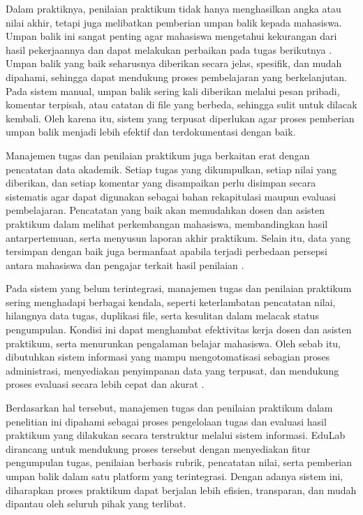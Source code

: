 \documentclass[12pt,a4paper,twoside]{report}
\begin{document}
Dalam praktiknya, penilaian praktikum tidak hanya menghasilkan angka atau nilai akhir, tetapi juga melibatkan pemberian umpan balik kepada mahasiswa. Umpan balik ini sangat penting agar mahasiswa mengetahui kekurangan dari hasil pekerjaannya dan dapat melakukan perbaikan pada tugas berikutnya \cite{nicol2006}. Umpan balik yang baik seharusnya diberikan secara jelas, spesifik, dan mudah dipahami, sehingga dapat mendukung proses pembelajaran yang berkelanjutan. Pada sistem manual, umpan balik sering kali diberikan melalui pesan pribadi, komentar terpisah, atau catatan di file yang berbeda, sehingga sulit untuk dilacak kembali. Oleh karena itu, sistem yang terpusat diperlukan agar proses pemberian umpan balik menjadi lebih efektif dan terdokumentasi dengan baik.

Manajemen tugas dan penilaian praktikum juga berkaitan erat dengan pencatatan data akademik. Setiap tugas yang dikumpulkan, setiap nilai yang diberikan, dan setiap komentar yang disampaikan perlu disimpan secara sistematis agar dapat digunakan sebagai bahan rekapitulasi maupun evaluasi pembelajaran. Pencatatan yang baik akan memudahkan dosen dan asisten praktikum dalam melihat perkembangan mahasiswa, membandingkan hasil antarpertemuan, serta menyusun laporan akhir praktikum. Selain itu, data yang tersimpan dengan baik juga bermanfaat apabila terjadi perbedaan persepsi antara mahasiswa dan pengajar terkait hasil penilaian \cite{romero2020}.

Pada sistem yang belum terintegrasi, manajemen tugas dan penilaian praktikum sering menghadapi berbagai kendala, seperti keterlambatan pencatatan nilai, hilangnya data tugas, duplikasi file, serta kesulitan dalam melacak status pengumpulan. Kondisi ini dapat menghambat efektivitas kerja dosen dan asisten praktikum, serta menurunkan pengalaman belajar mahasiswa. Oleh sebab itu, dibutuhkan sistem informasi yang mampu mengotomatisasi sebagian proses administrasi, menyediakan penyimpanan data yang terpusat, dan mendukung proses evaluasi secara lebih cepat dan akurat \cite{bradley2021}.

Berdasarkan hal tersebut, manajemen tugas dan penilaian praktikum dalam penelitian ini dipahami sebagai proses pengelolaan tugas dan evaluasi hasil praktikum yang dilakukan secara terstruktur melalui sistem informasi. EduLab dirancang untuk mendukung proses tersebut dengan menyediakan fitur pengumpulan tugas, penilaian berbasis rubrik, pencatatan nilai, serta pemberian umpan balik dalam satu platform yang terintegrasi. Dengan adanya sistem ini, diharapkan proses praktikum dapat berjalan lebih efisien, transparan, dan mudah dipantau oleh seluruh pihak yang terlibat.
\end{document}
